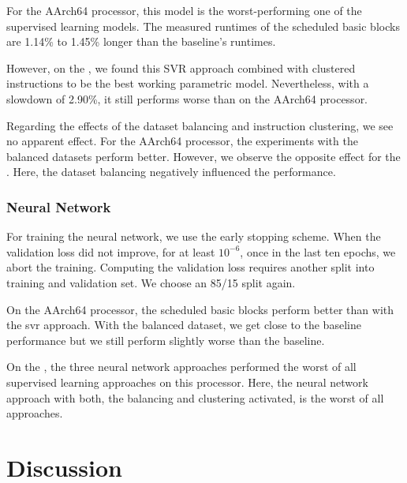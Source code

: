 For the AArch64 processor, this model is the worst-performing one of the supervised learning models.
The measured runtimes of the scheduled basic blocks are 1.14\% to 1.45\% longer than the baseline's runtimes.

However, on the \aurora{}, we found this SVR approach combined with clustered instructions to be the best working parametric model.
Nevertheless, with a slowdown of 2.90\%, it still performs worse than on the AArch64 processor.

Regarding the effects of the dataset balancing and instruction clustering, we see no apparent effect.
For the AArch64 processor, the experiments with the balanced datasets perform better.
However, we observe the opposite effect for the \aurora{}.
Here, the dataset balancing negatively influenced the performance.

\subsubsection{Neural Network}
\label{sec:eval:nn}
For training the neural network, we use the early stopping scheme.
When the validation loss did not improve, for at least $10^{-6}$, once in the last ten epochs, we abort the training.
Computing the validation loss requires another split into training and validation set. 
We choose an 85/15 split again.

On the AArch64 processor, the scheduled basic blocks perform better than with the \ac{svr} approach.
With the balanced dataset, we get close to the baseline performance but we still perform slightly worse than the baseline.

On the \aurora{}, the three neural network approaches performed the worst of all supervised learning approaches on this processor.
Here, the neural network approach with both, the balancing and clustering activated, is the worst of all approaches.


\section{Discussion}
\label{sec:eval:discussion}
